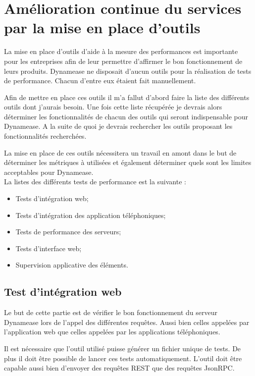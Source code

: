 \section{Amélioration continue du services par la mise en place d'outils}

La mise en place d'outils d'aide à la mesure des performances est importante pour les entreprises afin de leur permettre d'affirmer le bon fonctionnement de leurs produits. Dynamease ne disposait d'aucun outils pour la réalisation de tests de performance. Chacun d'entre eux étaient fait manuellement.

Afin de mettre en place ces outils il m'a fallut d'abord faire la liste des différents outils dont j'aurais besoin. Une fois cette liste récupérée je devrais alors déterminer les fonctionnalités de chacun des outils qui seront indispensable pour Dynamease. A la suite de quoi je devrais rechercher les outils proposant les fonctionnalités recherchées.

La mise en place de ces outils nécessitera un travail en amont dans le but de déterminer les métriques à utilisées et également déterminer quels sont les limites acceptables pour Dynamease.\\

La listes des différents tests de performance est la suivante :

\begin{itemize}
	\item Tests d'intégration web;
	\item Tests d'intégration des application téléphoniques;
	\item Tests de performance des serveurs;
	\item Tests d'interface web;
	\item Supervision applicative des éléments.
\end{itemize}

\subsection{Test d'intégration web}

Le but de cette partie est de vérifier le bon fonctionnement du serveur Dynamease lors de l'appel des différentes requêtes. Aussi bien celles appelées par l'application web que celles appelées par les applications téléphoniques.

Il est nécessaire que l'outil utilisé puisse générer un fichier unique de tests. De plus il doit être possible de lancer ces tests automatiquement. L'outil doit être capable aussi bien d'envoyer des requêtes REST que des requêtes JsonRPC.

